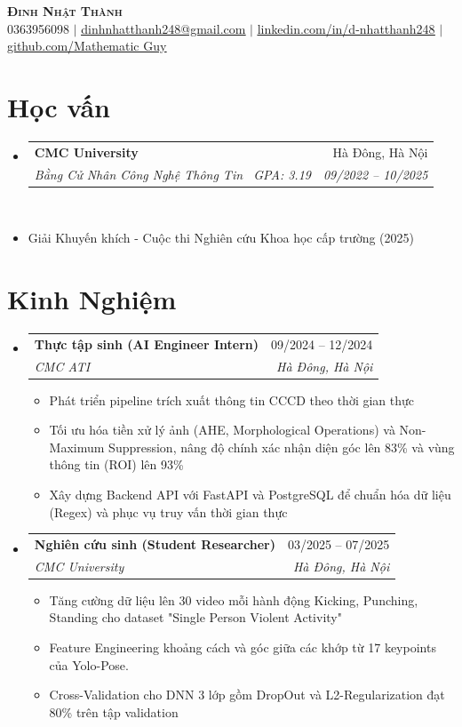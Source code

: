 \documentclass[letterpaper,11pt]{article}
\makeatletter
\newcommand{\resumeItem}[1]{
  \item\small{
    {#1 \vspace{-2pt}}
  }
}
\newcommand{\resumeSubheading}[4]{
  \vspace{-2pt}\item
    \begin{tabular*}{0.97\textwidth}[t]{l@{\extracolsep{\fill}}r}
      \textbf{#1} & #2 \\
      \textit{\small#3} & \textit{\small #4} \\
    \end{tabular*}\vspace{-7pt}
}
\newcommand{\resumeSubHeadingListStart}{\begin{itemize}[leftmargin=0.15in, label={}]}
\newcommand{\resumeSubHeadingListEnd}{\end{itemize}}
\makeatother
\begin{document}
\begin{center}
    \textbf{\Huge \scshape Đinh Nhật Thành} \\ \vspace{1pt}
    \small 0363956098 $|$ \href{mailto:dinhnhatthanh248@gmail.com}{\underline{dinhnhatthanh248@gmail.com}} $|$
    \href{https://linkedin.com/in/d-nhatthanh248}{\underline{linkedin.com/in/d-nhatthanh248}} $|$
    \href{https://github.com/MathematicGuy}{\underline{github.com/Mathematic Guy}}
\end{center}

\section{Học vấn}
	\resumeSubHeadingListStart
	\resumeSubheading
		{CMC University}{Hà Đông, Hà Nội}
		{Bằng Cử Nhân Công Nghệ Thông Tin \textbar \ GPA: 3.19}{09/2022 -- 10/2025} \\
		\resumeItem{} {Giải Khuyến khích - Cuộc thi Nghiên cứu Khoa học cấp trường (2025)}
	\resumeSubHeadingListEnd

\section{Kinh Nghiệm}
	\resumeSubHeadingListStart
	\resumeSubheading
		{Thực tập sinh (AI Engineer Intern)}{09/2024 -- 12/2024}
		{CMC ATI}{Hà Đông, Hà Nội}

		\begin{itemize}
			\item Phát triển pipeline trích xuất thông tin CCCD theo thời gian thực
			\item Tối ưu hóa tiền xử lý ảnh (AHE, Morphological Operations) và Non-Maximum Suppression, nâng độ chính xác nhận diện góc lên 83\% và vùng thông tin (ROI) lên 93\%
			\item Xây dựng Backend API với FastAPI và PostgreSQL để chuẩn hóa dữ liệu (Regex) và phục vụ truy vấn thời gian thực
		\end{itemize}

	\resumeSubheading
		{Nghiên cứu sinh (Student Researcher)}{03/2025 -- 07/2025}
		{CMC University}{Hà Đông, Hà Nội}
		\begin{itemize}
			\item Tăng cường dữ liệu lên 30 video mỗi hành động Kicking, Punching, Standing cho dataset "Single Person Violent Activity"
			\item Feature Engineering khoảng cách và góc giữa các khớp từ 17 keypoints của Yolo-Pose.
			\item Cross-Validation cho DNN 3 lớp gồm DropOut và L2-Regularization đạt 80\% trên tập validation
		\end{itemize}
	\resumeSubHeadingListEnd
\end{document}
